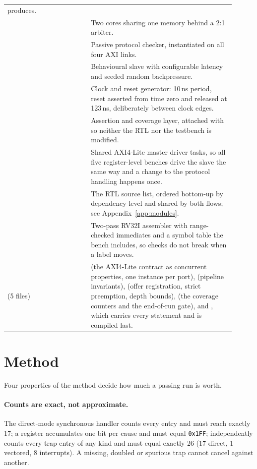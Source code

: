 {\begin{longtable}{@{}L{0.33\linewidth}L{0.58\linewidth}@{}}
  produces. \\
 & Two cores sharing one memory behind a 2:1 arbiter. \\
 & Passive protocol checker, instantiated on all four AXI links. \\
 & Behavioural slave with configurable latency and seeded
  random  backpressure. \\
 & Clock and reset generator: 10\,ns period, reset asserted from time
  zero and released at 123\,ns, deliberately between clock edges. \\
 & Assertion and coverage layer, attached with  so neither the RTL nor
  the testbench is modified. \\
 & Shared AXI4-Lite master driver tasks, so all five
  register-level benches drive the slave the same way and a change to the protocol handling
  happens once. \\
 & The RTL source list, ordered bottom-up by dependency level and shared by
  both flows; see Appendix~\ref{app:modules}. \\
 & Two-pass RV32I assembler with range-checked immediates and a symbol
  table the bench includes, so checks do not break when a label moves. \\
 (5 files) &  (the AXI4-Lite contract as concurrent
  properties, one instance per port),  (pipeline invariants),
   (offer registration, strict preemption, depth bounds),
   (the coverage counters and the end-of-run gate), and
  , which carries every  statement and is compiled last. \\
\end{longtable}}

\section{Method}
\label{sec:method}

Four properties of the method decide how much a passing run is worth.

\paragraph{Counts are exact, not approximate.} The direct-mode synchronous
handler counts every entry and must reach exactly 17; a register accumulates one
bit per cause and must equal \texttt{0x1FF};  independently
counts every trap entry of any kind and must equal exactly 26 (17 direct, 1
vectored, 8 interrupts). A missing, doubled or spurious trap cannot cancel
against another.

